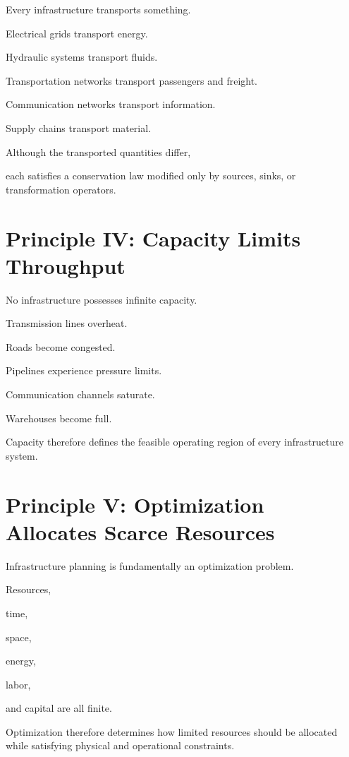 \documentclass[11pt,fleqn]{book}
\numberwithin{equation}{chapter}
\theoremstyle{plain}
\theoremstyle{definition}
\theoremstyle{remark}
\begin{document}
Every infrastructure transports something.

Electrical grids transport energy.

Hydraulic systems transport fluids.

Transportation networks transport passengers and freight.

Communication networks transport information.

Supply chains transport material.

Although the transported quantities differ,

each satisfies a conservation law modified only by sources,
sinks,
or transformation operators.


\section{Principle IV: Capacity Limits Throughput}

No infrastructure possesses infinite capacity.

Transmission lines overheat.

Roads become congested.

Pipelines experience pressure limits.

Communication channels saturate.

Warehouses become full.

Capacity therefore defines the feasible operating region of every
infrastructure system.


\section{Principle V: Optimization Allocates Scarce Resources}

Infrastructure planning is fundamentally an optimization problem.

Resources,

time,

space,

energy,

labor,

and capital are all finite.

Optimization therefore determines how limited resources should be
allocated while satisfying physical and operational constraints.
\end{document}
